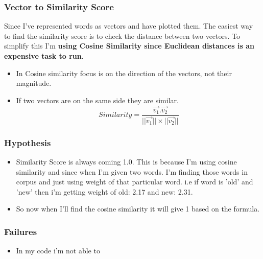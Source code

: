 \documentclass{article}
\begin{document}
\subsubsection{Vector to Similarity Score}
Since I've represented words as vectors and have plotted them. The easiest way to find the similarity score is to check the distance between two vectors. To simplify this I'm \textbf{using Cosine Similarity since Euclidean distances is an expensive task to run}. 
\begin{itemize}
    \item In Cosine similarity focus is on the direction of the vectors, not their magnitude.
    \item If two vectors are on the same side they are similar.
    $$
    Similarity = \frac{\vec{v_1}.\vec{v_2}}{||\vec{v_1}|| \times ||\vec{v_2}||}
    $$
\end{itemize}

\subsubsection{Hypothesis}
\begin{itemize}
\item Similarity Score is always coming 1.0. This is because I'm using cosine similarity and since when I'm given two words. I'm finding those words in corpus and just using weight of that particular word. i.e if word is 'old' and 'new' then i'm getting weight of old: 2.17 and new: 2.31.
\item So now when I'll find the cosine similarity it will give 1 based on the formula.
\end{itemize}

\subsubsection{Failures}
\begin{itemize}
\item In my code i'm not able to 
\end{itemize}
\end{document}
